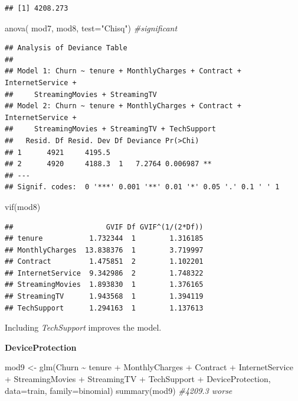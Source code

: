 \documentclass[
  twoside]{article}
\newenvironment{Shaded}{\begin{snugshade}}{\end{snugshade}}
\newcommand{\AttributeTok}[1]{\textcolor[rgb]{0.77,0.63,0.00}{#1}}
\newcommand{\CommentTok}[1]{\textcolor[rgb]{0.56,0.35,0.01}{\textit{#1}}}
\newcommand{\FunctionTok}[1]{\textcolor[rgb]{0.00,0.00,0.00}{#1}}
\newcommand{\NormalTok}[1]{#1}
\newcommand{\OtherTok}[1]{\textcolor[rgb]{0.56,0.35,0.01}{#1}}
\newcommand{\SpecialCharTok}[1]{\textcolor[rgb]{0.00,0.00,0.00}{#1}}
\newcommand{\StringTok}[1]{\textcolor[rgb]{0.31,0.60,0.02}{#1}}
\begin{document}
\begin{verbatim}
## [1] 4208.273
\end{verbatim}

\begin{Shaded}
\begin{Highlighting}[]
\FunctionTok{anova}\NormalTok{( mod7, mod8,  }\AttributeTok{test=}\StringTok{"Chisq"}\NormalTok{) }\CommentTok{\#significant}
\end{Highlighting}
\end{Shaded}

\begin{verbatim}
## Analysis of Deviance Table
## 
## Model 1: Churn ~ tenure + MonthlyCharges + Contract + InternetService + 
##     StreamingMovies + StreamingTV
## Model 2: Churn ~ tenure + MonthlyCharges + Contract + InternetService + 
##     StreamingMovies + StreamingTV + TechSupport
##   Resid. Df Resid. Dev Df Deviance Pr(>Chi)   
## 1      4921     4195.5                        
## 2      4920     4188.3  1   7.2764 0.006987 **
## ---
## Signif. codes:  0 '***' 0.001 '**' 0.01 '*' 0.05 '.' 0.1 ' ' 1
\end{verbatim}

\begin{Shaded}
\begin{Highlighting}[]
\FunctionTok{vif}\NormalTok{(mod8)}
\end{Highlighting}
\end{Shaded}

\begin{verbatim}
##                      GVIF Df GVIF^(1/(2*Df))
## tenure           1.732344  1        1.316185
## MonthlyCharges  13.838376  1        3.719997
## Contract         1.475851  2        1.102201
## InternetService  9.342986  2        1.748322
## StreamingMovies  1.893830  1        1.376165
## StreamingTV      1.943568  1        1.394119
## TechSupport      1.294163  1        1.137613
\end{verbatim}

Including \emph{TechSupport} improves the model.

\textbf{DeviceProtection}

\begin{Shaded}
\begin{Highlighting}[]
\NormalTok{mod9 }\OtherTok{\textless{}{-}} \FunctionTok{glm}\NormalTok{(Churn }\SpecialCharTok{\textasciitilde{}}\NormalTok{ tenure }\SpecialCharTok{+}\NormalTok{ MonthlyCharges }\SpecialCharTok{+}\NormalTok{ Contract }\SpecialCharTok{+}\NormalTok{ InternetService }\SpecialCharTok{+} 
\NormalTok{            StreamingMovies }\SpecialCharTok{+}\NormalTok{ StreamingTV }\SpecialCharTok{+}\NormalTok{ TechSupport }\SpecialCharTok{+}\NormalTok{ DeviceProtection, }
            \AttributeTok{data=}\NormalTok{train, }\AttributeTok{family=}\NormalTok{binomial)}
\FunctionTok{summary}\NormalTok{(mod9) }\CommentTok{\#4209.3 worse}
\end{Highlighting}
\end{Shaded}
\end{document}
